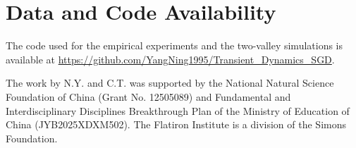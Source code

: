 \documentclass[aps,prx,reprint,superscriptaddress,longbibliography,nofootinbib,floatfix]{revtex4-2}
\begin{document}
\section*{Data and Code Availability}
The code used for the empirical experiments and the two-valley simulations is available at
\url{https://github.com/YangNing1995/Transient_Dynamics_SGD}.

\begin{acknowledgments}
The work by N.Y. and C.T. was supported by the National Natural Science Foundation of China (Grant No. 12505089) and Fundamental and Interdisciplinary Disciplines Breakthrough Plan of the Ministry of Education of China (JYB2025XDXM502). The Flatiron Institute is a division of the Simons Foundation.
\end{acknowledgments}


\end{document}
